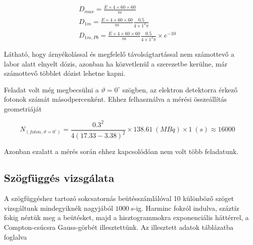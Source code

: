 \documentclass[a4paper,12pt]{article}
\begin{document}
\begin{gather*}
D_{max} = \frac{\dot{E}\times 4\times 60\times 60}{m} \\
D_{1m} = \frac{\dot{E}\times 4\times 60\times 60}{m} \frac{0.5}{4\times 1^{2} \pi} \\
D_{1m, Pb} = \frac{\dot{E}\times 4\times 60\times 60}{m} \frac{0.5}{4\times 1^{2} \pi} \times e^{-10}
\end{gather*}

\par Látható, hogy árnyékolással és megfelelő távolságtartással nem számottevő a labor alatt elnyelt dózis, azonban ha közvetlenül a szerezetbe kerülne, már számottevő többlet dózist lehetne kapni.

\par Feladat volt még megbecsülni a $\vartheta = 0^{\circ}$ szögben, az elektron detektorra érkező fotonok számát másodpercenként. Ehhez felhasználva a mérési összeállítás geometriáját

\begin{equation*}
	N_{(foton, \vartheta = 0^{\circ})} = \frac{0.3^{2}}{4(17.33-3.38)^{2}}\times 138.61 ~(MBq) \times 1 ~(s) \approx 16 000
\end{equation*} 

\par Azonban ezalatt a mérés során ehhez kapcsolódóan nem volt több feladatunk.

\subsection{Szögfüggés vizsgálata}

\par A szögfüggéshez tartozó sokcsatornás beütésszámlálóval 10 különböző szöget vizsgáltunk mindegyiknék nagyjából $1000~s$-ig. Harminc fokról indulva, száztíz fokig néztük meg a beütésket, majd a hisztogrammokra exponenciális háttérrel, a Compton-csúcsra Gauss-görbét illesztettünk. Az illesztett adatok táblázatba foglalva
\end{document}

